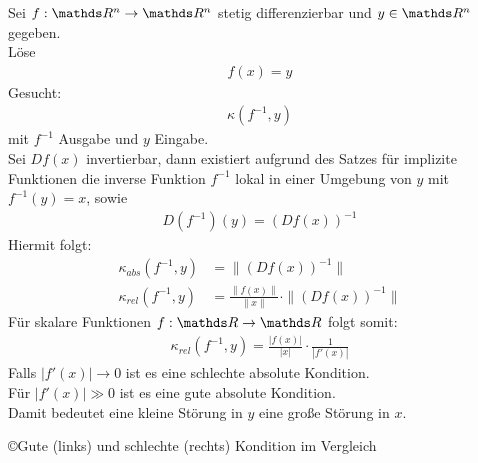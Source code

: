 \begin{Bspe}
  Sei $f:\Ren\rightarrow\Ren$ stetig differenzierbar und $y\in\Ren$ gegeben. \\
  Löse
  \begin{gather*}
    f(x) = y
  \end{gather*}
  Gesucht:
  \begin{gather*}
    \kappa(f^{-1},y)
  \end{gather*}
  mit $f^{-1}$ Ausgabe und $y$ Eingabe. \\
  Sei $Df(x)$ invertierbar, dann existiert aufgrund des Satzes für implizite Funktionen die inverse Funktion $f^{-1}$ lokal in einer Umgebung von $y$ mit $f^{-1}(y)=x$, sowie
  \begin{gather*}
    D(f^{-1})(y) = (Df(x))^{-1}
  \end{gather*}
  Hiermit folgt:
  \begin{align}
    \nonumber
    \kappa_{abs}(f^{-1},y) &= \|(Df(x))^{-1}\| \\
    \kappa_{rel}(f^{-1},y) &= \frac{\|f(x)\|}{\|x\|}\cdot\|(Df(x))^{-1}\|  \label{III.2.15}
  \end{align}
  Für skalare Funktionen $f:\R\rightarrow\R$ folgt somit:
  \begin{gather*}
    \kappa_{rel}(f^{-1},y) = \frac{|f(x)|}{|x|}\cdot \frac{1}{|f'(x)|}
  \end{gather*}
  Falls $|f'(x)|\longrightarrow 0$ ist es eine schlechte absolute Kondition. \\
  Für $|f'(x)| \gg 0$ ist es eine gute absolute Kondition.\\
  Damit bedeutet eine kleine Störung in $y$ eine große Störung in $x$.\\
  \begin{image}{\copyright Gute (links) und schlechte (rechts) Kondition im Vergleich}
\end{image}
\end{Bspe}
